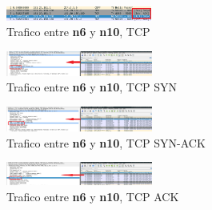 \documentclass[letterpaper, 10 pt, conference]{ieeeconf}  %
\begin{document}
\begin{figure}[H]
	\centering
	\includegraphics[width=0.43\textwidth]{./Imagenes/trafico0.png}
	\caption{Trafico entre \textbf{n6} y \textbf{n10}, TCP}
	\label{fig:wireshark_0}
\end{figure}

\begin{figure}[H]
	\centering
	\includegraphics[width=0.43\textwidth]{./Imagenes/trafico1.png}
	\caption{Trafico entre \textbf{n6} y \textbf{n10}, TCP SYN}
	\label{fig:wireshark_1}
\end{figure}

\begin{figure}[H]
	\centering
	\includegraphics[width=0.43\textwidth]{./Imagenes/trafico2.png}
	\caption{Trafico entre \textbf{n6} y \textbf{n10}, TCP SYN-ACK}
	\label{fig:wireshark_2}
\end{figure}

\begin{figure}[H]
	\centering
	\includegraphics[width=0.43\textwidth]{./Imagenes/trafico3.png}
	\caption{Trafico entre \textbf{n6} y \textbf{n10}, TCP ACK}
	\label{fig:wireshark_3}
\end{figure}
\end{document}
